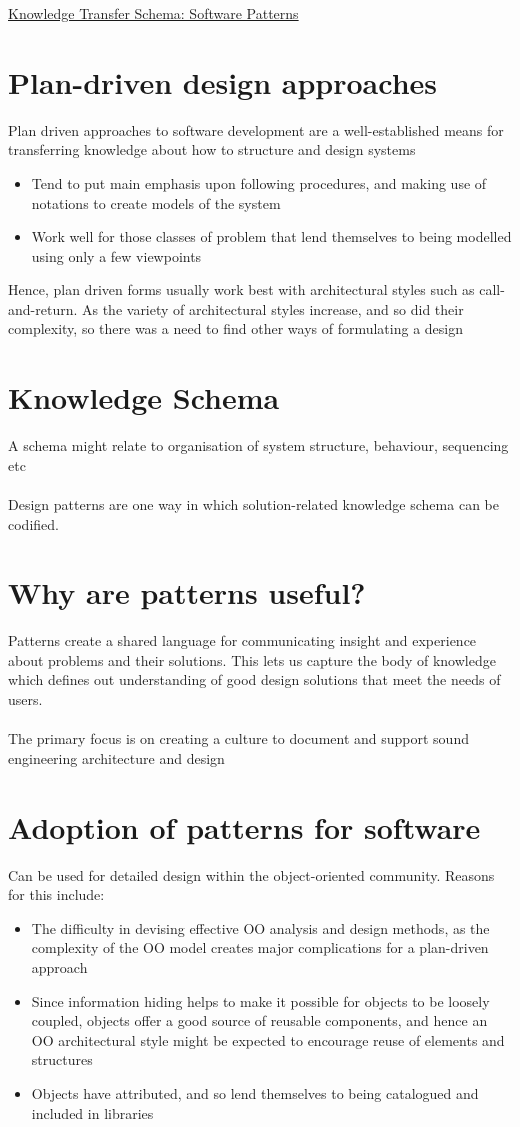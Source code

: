 \documentclass{article}[18pt]
\begin{document}
\begin{center}
\underline{\huge Knowledge Transfer Schema: Software Patterns}
\end{center}
\section{Plan-driven design approaches}
Plan driven approaches to software development are a well-established means for transferring knowledge about how to structure and design systems
\begin{itemize}
	\item Tend to put main emphasis upon following procedures, and making use of notations to create models of the system
	\item Work well for those classes of problem that lend themselves to being modelled using only a few viewpoints
\end{itemize}
Hence, plan driven forms usually work best with architectural styles such as call-and-return. As the variety of architectural styles increase, and so did their complexity, so there was a need to find other ways of formulating a design
\section{Knowledge Schema}
A schema might relate to organisation of system structure, behaviour, sequencing etc\\
\\
Design patterns are one way in which solution-related knowledge schema can be codified.
\section{Why are patterns useful?}
Patterns create a shared language for communicating insight and experience about problems and their solutions. This lets us capture the body of knowledge which defines out understanding of good design solutions that meet the needs of users.\\
\\
The primary focus is on creating a culture to document and support sound engineering architecture and design 
\section{Adoption of patterns for software}
Can be used for detailed design within the object-oriented community. Reasons for this include:
\begin{itemize}
	\item The difficulty in devising effective OO analysis and design methods, as the complexity of the OO model creates major complications for a plan-driven approach
	\item Since information hiding helps to make it possible for objects to be loosely coupled, objects offer a good source of reusable components, and hence an OO architectural style might be expected to encourage reuse of elements and structures
	\item Objects have attributed, and so lend themselves to being catalogued and included in libraries  
\end{itemize}
\end{document}
